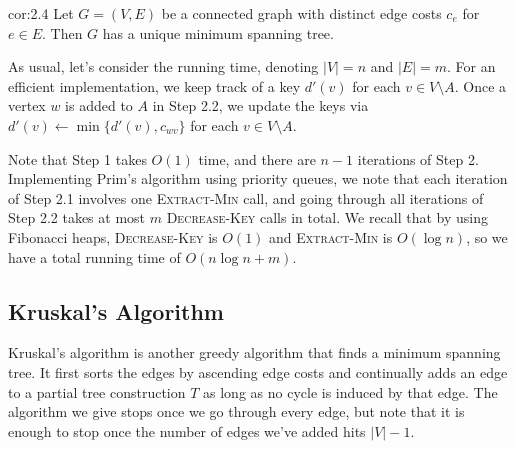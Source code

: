 \begin{cor}{cor:2.4}
    Let $G = (V, E)$ be a connected graph with distinct edge costs $c_e$ for 
    $e \in E$. Then $G$ has a unique minimum spanning tree.
\end{cor}\vspace{-0.25cm}

As usual, let's consider the running time, denoting $|V| = n$ 
and $|E| = m$. For an efficient implementation, 
we keep track of a key $d'(v)$ for each $v \in V \setminus A$. 
Once a vertex $w$ is added to $A$ in Step 2.2, we update the keys via 
$d'(v) \gets \min\{d'(v), c_{wv}\}$ for each $v \in V \setminus A$. 

Note that Step 1 takes $O(1)$ time, and 
there are $n-1$ iterations of Step 2. Implementing Prim's algorithm 
using priority queues, we note that each iteration of Step 2.1 
involves one \textsc{Extract-Min} call, and 
going through all iterations of Step 2.2 takes at most $m$ 
\textsc{Decrease-Key} calls in total. We recall that by using Fibonacci heaps, 
\textsc{Decrease-Key} is $O(1)$ and \textsc{Extract-Min} is $O(\log n)$, 
so we have a total running time of $O(n\log n + m)$.

\subsection{Kruskal's Algorithm}\label{subsec:2.4}
Kruskal's algorithm is another greedy algorithm that finds a minimum 
spanning tree. It first sorts the edges by ascending edge costs 
and continually adds an edge to a partial tree construction $T$ as long as no 
cycle is induced by that edge. The algorithm we give stops once we 
go through every edge, but note that it is enough to stop once the 
number of edges we've added hits $|V| - 1$.

